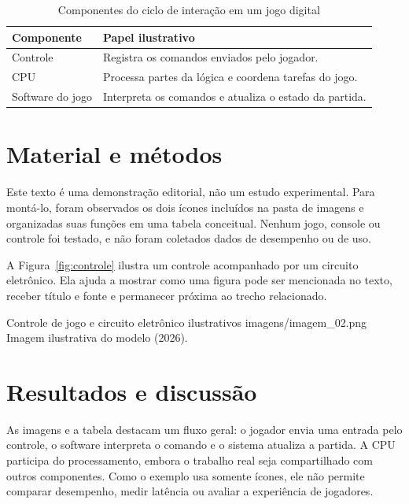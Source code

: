 \begin{table}[H]
  \centering
  \caption{\label{tab:elementos-modelo}Componentes do ciclo de interação em um jogo digital}
  \begin{tabular}{p{} p{}}
    \toprule
    \textbf{Componente} & \textbf{Papel ilustrativo} \\
    \midrule
    Controle & Registra os comandos enviados pelo jogador. \\
    CPU & Processa partes da lógica e coordena tarefas do jogo. \\
    Software do jogo & Interpreta os comandos e atualiza o estado da partida. \\
    \bottomrule
  \end{tabular}
\end{table}

\section{Material e métodos}
Este texto é uma demonstração editorial, não um estudo experimental. Para
montá-lo, foram observados os dois ícones incluídos na pasta de imagens e
organizadas suas funções em uma tabela conceitual. Nenhum jogo, console ou
controle foi testado, e não foram coletados dados de desempenho ou de uso.

A Figura~\ref{fig:controle} ilustra um controle acompanhado por um circuito
eletrônico. Ela ajuda a mostrar como uma figura pode ser mencionada no texto,
receber título e fonte e permanecer próxima ao trecho relacionado.

  {Controle de jogo e circuito eletrônico ilustrativos}
  {imagens/imagem_02.png}
  {Imagem ilustrativa do modelo (2026).}

\section{Resultados e discussão}
As imagens e a tabela destacam um fluxo geral: o jogador envia uma entrada pelo
controle, o software interpreta o comando e o sistema atualiza a partida. A
CPU participa do processamento, embora o trabalho real seja compartilhado com
outros componentes. Como o exemplo usa somente ícones, ele não permite comparar
desempenho, medir latência ou avaliar a experiência de jogadores.

